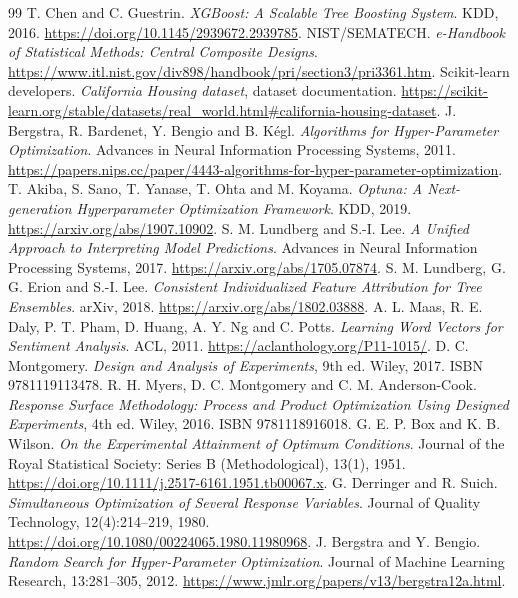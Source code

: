 \begin{thebibliography}{99}\small
{} T. Chen and C. Guestrin. \emph{XGBoost: A Scalable Tree Boosting System}. KDD, 2016. \url{https://doi.org/10.1145/2939672.2939785}.
 NIST/SEMATECH. \emph{e-Handbook of Statistical Methods: Central Composite Designs}. \url{https://www.itl.nist.gov/div898/handbook/pri/section3/pri3361.htm}.
 Scikit-learn developers. \emph{California Housing dataset}, dataset documentation. \url{https://scikit-learn.org/stable/datasets/real_world.html#california-housing-dataset}.
 J. Bergstra, R. Bardenet, Y. Bengio and B. K\'egl. \emph{Algorithms for Hyper-Parameter Optimization}. Advances in Neural Information Processing Systems, 2011. \url{https://papers.nips.cc/paper/4443-algorithms-for-hyper-parameter-optimization}.
 T. Akiba, S. Sano, T. Yanase, T. Ohta and M. Koyama. \emph{Optuna: A Next-generation Hyperparameter Optimization Framework}. KDD, 2019. \url{https://arxiv.org/abs/1907.10902}.
 S. M. Lundberg and S.-I. Lee. \emph{A Unified Approach to Interpreting Model Predictions}. Advances in Neural Information Processing Systems, 2017. \url{https://arxiv.org/abs/1705.07874}.
 S. M. Lundberg, G. G. Erion and S.-I. Lee. \emph{Consistent Individualized Feature Attribution for Tree Ensembles}. arXiv, 2018. \url{https://arxiv.org/abs/1802.03888}.
 A. L. Maas, R. E. Daly, P. T. Pham, D. Huang, A. Y. Ng and C. Potts. \emph{Learning Word Vectors for Sentiment Analysis}. ACL, 2011. \url{https://aclanthology.org/P11-1015/}.
 D. C. Montgomery. \emph{Design and Analysis of Experiments}, 9th ed. Wiley, 2017. ISBN 9781119113478.
 R. H. Myers, D. C. Montgomery and C. M. Anderson-Cook. \emph{Response Surface Methodology: Process and Product Optimization Using Designed Experiments}, 4th ed. Wiley, 2016. ISBN 9781118916018.
 G. E. P. Box and K. B. Wilson. \emph{On the Experimental Attainment of Optimum Conditions}. Journal of the Royal Statistical Society: Series B (Methodological), 13(1), 1951. \url{https://doi.org/10.1111/j.2517-6161.1951.tb00067.x}.
 G. Derringer and R. Suich. \emph{Simultaneous Optimization of Several Response Variables}. Journal of Quality Technology, 12(4):214--219, 1980. \url{https://doi.org/10.1080/00224065.1980.11980968}.
 J. Bergstra and Y. Bengio. \emph{Random Search for Hyper-Parameter Optimization}. Journal of Machine Learning Research, 13:281--305, 2012. \url{https://www.jmlr.org/papers/v13/bergstra12a.html}.

\end{thebibliography}
